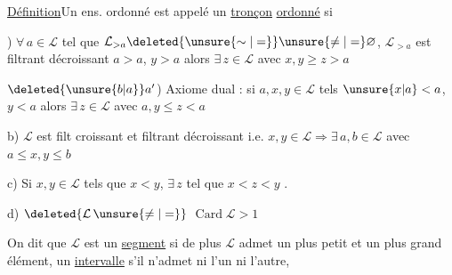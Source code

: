 


\uline{Définition}\quad Un ens. ordonné  est appelé un \uline{tronçon} \uline{ordonné} si

) $\forall\,a\in\mathcal L$ tel que $\mathcal L_{>a}\deleted{\unsure{\sim|=}}\unsure{\ne|=}\varnothing$, $\mathcal L_{>a}$ est filtrant décroissant
 
$a>a$, $y>a$ alors $\exists\,z\in\mathcal L$ avec $x,y\geq z>a$

$\deleted{\unsure{b|a}}a'$) Axiome dual : si $a,x,y\in\mathcal L$ tels 
$\unsure{x|a}<a$, $y<a$ alors $\exists\,z\in\mathcal L$ avec $a,y\leq z<a$

b) $\mathcal L$ est filt croissant et filtrant décroissant i.e.
$x,y\in\mathcal L\Rightarrow\exists\,a,b\in\mathcal L$ avec $a\leq x,y\leq b$

c) Si $x,y\in\mathcal L$ tels que $x<y$, $\exists\,z$ tel que $x<z<y$ .

d) $\deleted{\mathcal L\,\unsure{\ne|=}}$ $\operatorname{Card}\mathcal L>1$ 


On dit que $\mathcal L$ est un \uline{segment} si de plus $\mathcal L$ admet un plus petit et
 un plus grand élément, un \uline{intervalle} s'il n'admet ni l'un ni l'autre,


